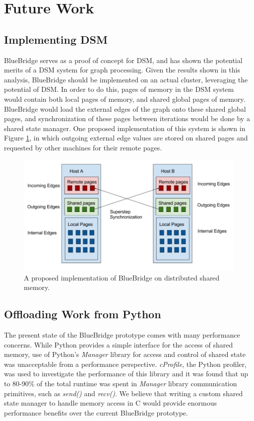 \section{Future Work}
\label{sec:future}

\subsection{Implementing DSM}

BlueBridge serves as a proof of concept for DSM, and has shown the potential
merits of a DSM system for graph processing. Given the results shown in this
analysis, BlueBridge should be implemented on an actual cluster, leveraging
the potential of DSM. In order to do this, pages of memory in the DSM system
would contain both local pages of memory, and shared global pages of memory.
BlueBridge would load the external edges of the graph onto these shared global
pages, and synchronization of these pages between iterations would be done
by a shared state manager. One proposed implementation of this system is shown
in Figure \ref{fig:dsm}, in which outgoing external edge values are stored on
shared pages and requested by other machines for their remote pages.

\begin{figure}[h]
\includegraphics[width=\linewidth]{"fig/dsm_implementation"}
\caption{A proposed implementation of BlueBridge on distributed shared memory.}
\label{fig:dsm}
\end{figure}

\subsection{Offloading Work from Python}

The present state of the BlueBridge prototype comes with many performance
concerns. While Python provides a simple interface for the access of shared
memory, use of Python's \textit{Manager} library for access and control of
shared state was unacceptable from a performance perspective. \textit{cProfile},
the Python profiler, was used to investigate the performance of this library
and it was found that up to 80-90\% of the total runtime was spent in
\textit{Manager} library communication primitives, such as \textit{send()} and
\textit{recv()}. We believe that writing a custom shared state manager to handle
memory access in C would provide enormous performance benefits over the current
BlueBridge prototype.